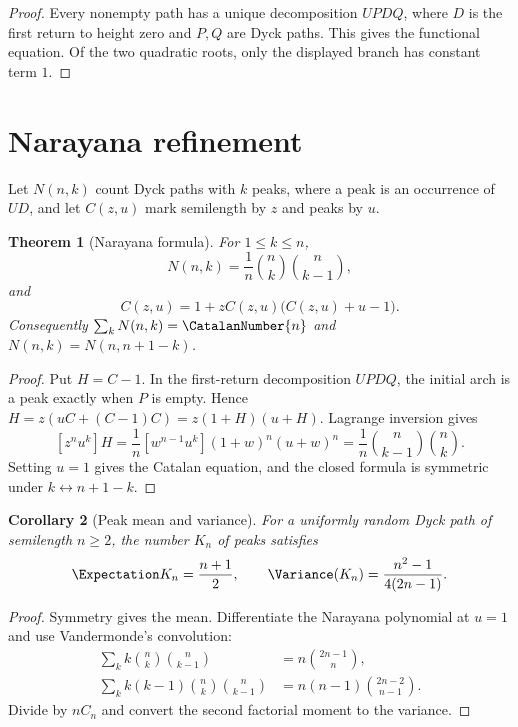 \documentclass[11pt,a4paper,oneside,openany]{book}
\newtheorem{theorem}{Theorem}[chapter]
\newtheorem{corollary}[theorem]{Corollary}
\theoremstyle{definition}
\theoremstyle{remark}
\begin{document}
\begin{proof}
Every nonempty path has a unique decomposition $UPDQ$, where $D$ is the first
return to height zero and $P,Q$ are Dyck paths.  This gives the functional
equation.  Of the two quadratic roots, only the displayed branch has constant
term $1$.
\end{proof}

\section{Narayana refinement}

Let $N(n,k)$ count Dyck paths with $k$ peaks, where a peak is an occurrence of
$UD$, and let $C(z,u)$ mark semilength by $z$ and peaks by $u$.

\begin{theorem}[Narayana formula]
\label{thm:merged-narayana}
For $1\leq k\leq n$,
\begin{equation}
 N(n,k)=\frac1n\binom nk\binom n{k-1},                              \label{eq:merged-narayana}
\end{equation}
and
\begin{equation}
 C(z,u)=1+zC(z,u)\bigl(C(z,u)+u-1\bigr).                            \label{eq:merged-narayana-gf}
\end{equation}
Consequently $\sum_kN(n,k)=\CatalanNumber{n}$ and $N(n,k)=N(n,n+1-k)$.
\end{theorem}

\begin{proof}
Put $H=C-1$.  In the first-return decomposition $UPDQ$, the initial arch is a
peak exactly when $P$ is empty.  Hence
$H=z(uC+(C-1)C)=z(1+H)(u+H)$.  Lagrange inversion gives
\[
 [z^nu^k]H=\frac1n[w^{n-1}u^k](1+w)^n(u+w)^n
 =\frac1n\binom n{k-1}\binom nk.
\]
Setting $u=1$ gives the Catalan equation, and the closed formula is symmetric
under $k\leftrightarrow n+1-k$.
\end{proof}

\begin{corollary}[Peak mean and variance]
For a uniformly random Dyck path of semilength $n\geq2$, the number $K_n$ of
peaks satisfies
\begin{equation}
 \Expectation K_n=\frac{n+1}{2},
 \qquad \Variance(K_n)=\frac{n^2-1}{4(2n-1)}.                            \label{eq:merged-narayana-moments}
\end{equation}
\end{corollary}

\begin{proof}
Symmetry gives the mean.  Differentiate the Narayana polynomial at $u=1$ and
use Vandermonde's convolution:
\begin{align*}
 \sum_k k\binom nk\binom n{k-1}&=n\binom{2n-1}{n},\\
 \sum_k k(k-1)\binom nk\binom n{k-1}
 &=n(n-1)\binom{2n-2}{n-1}.
\end{align*}
Divide by $nC_n$ and convert the second factorial moment to the variance.
\end{proof}
\end{document}
